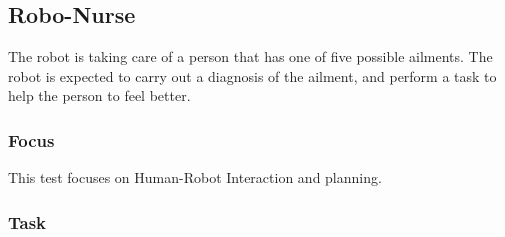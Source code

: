 \subsection{Robo-Nurse}

The robot is taking care of a person that has one of five possible ailments. The robot is expected to carry out a diagnosis of the ailment, and perform a task to help the person to feel better.

\subsubsection{Focus}

This test focuses on Human-Robot Interaction and planning.

\subsubsection{Task}
